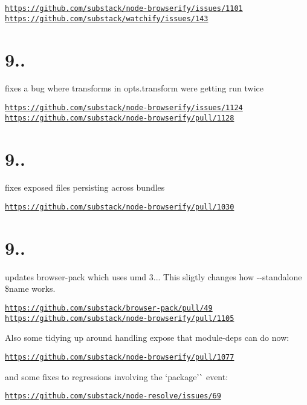 \href{https://github.com/substack/node-browserify/issues/1101}{\tt https\+://github.\+com/substack/node-\/browserify/issues/1101} \href{https://github.com/substack/watchify/issues/143}{\tt https\+://github.\+com/substack/watchify/issues/143}

\section*{9..}

fixes a bug where transforms in {\ttfamily opts.\+transform} were getting run twice

\href{https://github.com/substack/node-browserify/issues/1124}{\tt https\+://github.\+com/substack/node-\/browserify/issues/1124} \href{https://github.com/substack/node-browserify/pull/1128}{\tt https\+://github.\+com/substack/node-\/browserify/pull/1128}

\section*{9..}

fixes exposed files persisting across bundles

\href{https://github.com/substack/node-browserify/pull/1030}{\tt https\+://github.\+com/substack/node-\/browserify/pull/1030}

\section*{9..}

updates browser-\/pack which uses umd 3... This sligtly changes how {\ttfamily -\/-\/standalone \$name} works.

\href{https://github.com/substack/browser-pack/pull/49}{\tt https\+://github.\+com/substack/browser-\/pack/pull/49} \href{https://github.com/substack/node-browserify/pull/1105}{\tt https\+://github.\+com/substack/node-\/browserify/pull/1105}

Also some tidying up around handling expose that module-\/deps can do now\+:

\href{https://github.com/substack/node-browserify/pull/1077}{\tt https\+://github.\+com/substack/node-\/browserify/pull/1077}

and some fixes to regressions involving the `\textquotesingle{}package'\`{} event\+:

\href{https://github.com/substack/node-resolve/issues/69}{\tt https\+://github.\+com/substack/node-\/resolve/issues/69}

